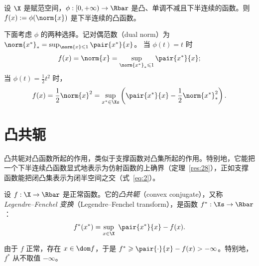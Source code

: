 \begin{example}[范数的函数]
\label{exa:8}
设 $\X$ 是赋范空间，$\phi:[0,+\infty)\to\Rbar$ 是凸、单调不减且下半连续的函数。则 $f(x):=\phi(\norm{x})$ 是下半连续的凸函数。

下面考虑 $\phi$ 的两种选择。记对偶范数（dual norm）为 $\norm{x^*}_*=\sup_{\norm{x}\leqslant1}\pair{x^*}{x}$。
当 $\phi(t)=t$ 时
\[
  f(x)=\norm{x}=\sup_{\norm{x^*}_*\leqslant1}\pair{x^*}{x};
\]
当 $\phi(t)=\frac12t^2$ 时，
\[
  f(x)=\frac12\norm{x}^2=\sup_{x^*\in\Xs}\left(\pair{x^*}{x}-\frac{1}{2}\norm{x^*}_*^2\right).
\]
\end{example}

\section{凸共轭}
\label{sec:ch02-conjugate}

凸共轭对凸函数所起的作用，类似于支撑函数对凸集所起的作用。特别地，它能把一个下半连续凸函数显式地表示为仿射函数的上确界（定理~\ref{res:28}），正如支撑函数能把闭凸集表示为闭半空间之交（式~\eqref{eq:2}）。

\begin{definition}[凸共轭]
\label{def:18}
设 $f:\X\to\Rbar$ 是正常函数。它的\emph{凸共轭}（convex conjugate），又称 \emph{Legendre--Fenchel 变换}（Legendre--Fenchel transform），是函数 $f^*:\Xs\to\Rbar$：
\[
  f^*(x^*)=\sup_{x\in\X}\ \pair{x^*}{x}-f(x).
\]
\end{definition}

由于 $f$ 正常，存在 $x\in\dom f$，于是 $f^*\geqslant\pair{\cdot}{x}-f(x)>-\infty$。特别地，$f^*$ 从不取值 $-\infty$。

